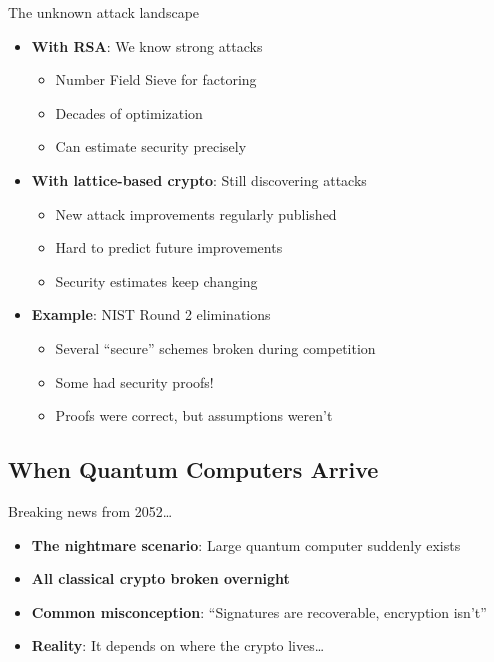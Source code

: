 \documentclass[aspectratio=169, lualatex, handout]{beamer}
\begin{document}
\begin{frame}{The unknown attack landscape}
	\begin{itemize}
		\item \textbf{With RSA}: We know strong attacks
		      \begin{itemize}
			      \item Number Field Sieve for factoring
			      \item Decades of optimization
			      \item Can estimate security precisely
		      \end{itemize}
		\item \textbf{With lattice-based crypto}: Still discovering attacks
		      \begin{itemize}
			      \item New attack improvements regularly published
			      \item Hard to predict future improvements
			      \item Security estimates keep changing
		      \end{itemize}
		\item \textbf{Example}: NIST Round 2 eliminations
		      \begin{itemize}
			      \item Several ``secure'' schemes broken during competition
			      \item Some had security proofs!
			      \item Proofs were correct, but assumptions weren't
		      \end{itemize}
	\end{itemize}
\end{frame}

\subsection{When Quantum Computers Arrive}
\begin{frame}{Breaking news from 2052\ldots}
	\begin{itemize}
		\item \textbf{The nightmare scenario}: Large quantum computer suddenly exists
		\item \textbf{All classical crypto broken overnight}
		\item \textbf{Common misconception}: ``Signatures are recoverable, encryption isn't''
		\item \textbf{Reality}: It depends on where the crypto lives\ldots
	\end{itemize}
\end{frame}
\end{document}
